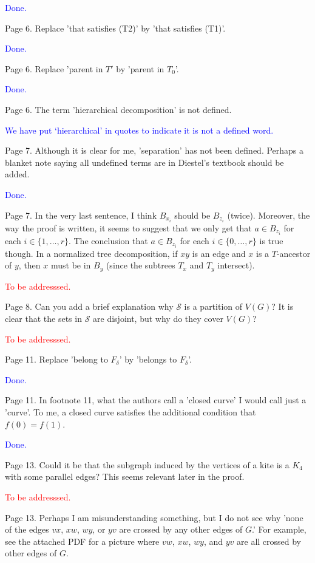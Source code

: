 \documentclass[12pt]{article}
\newcommand{\done}{\textcolor{blue}{Done.}}
\newcommand{\tba}{\textcolor{red}{To be addresssed.}}
\begin{document}
\done

Page 6. Replace 'that satisfies (T2)' by 'that satisfies (T1)'.

\done

Page 6. Replace 'parent in $T'$ by 'parent in $T_0$'.

\done

Page 6. The term 'hierarchical decomposition' is not defined.

\textcolor{blue}{We have put `hierarchical' in quotes to indicate it is not a defined word.}

Page 7. Although it is clear for me, 'separation' has not been
defined.  Perhaps a blanket note saying all undefined terms are in
Diestel's textbook should be added.

\done

Page 7.  In the very last sentence, I think $B_{x_i}$ should be $B_{z_i}$
(twice).  Moreover, the way the proof is written, it seems to suggest
that we only get that $a \in B_{z_i}$ for each $i \in \{1, \dots, r\}$.
The conclusion that $a \in B_{z_i}$ for each $i \in \{0, \dots, r\}$ is
true though.  In a normalized tree decomposition, if $xy$ is an edge and
$x$ is a $T$-ancestor of $y$, then $x$ must be in $B_y$ (since the subtrees $T_x$
and $T_y$ intersect).

\tba

Page 8.  Can you add a brief explanation why $\mathcal{S}$ is a
partition of $V(G)$?  It is clear that the sets in $\mathcal{S}$ are
disjoint, but why do they cover $V(G)$?

\tba

Page 11. Replace 'belong to $F_\delta$' by 'belongs to $F_\delta$'.

\done

Page 11. In footnote 11, what the authors call a 'closed curve' I
would call just a 'curve'.  To me, a closed curve satisfies the
additional condition that $f(0)=f(1)$.

\done

Page 13. Could it be that the subgraph induced by the vertices of a
kite is a $K_4$ with some parallel edges?  This seems relevant later in
the proof.

\tba

Page 13. Perhaps I am misunderstanding something, but I do not see why
'none of the edges $vx$, $xw$, $wy$, or $yv$ are crossed by any other edges of
$G$.'  For example, see the attached PDF for a picture where $vw$, $xw$, $wy$,
and $yv$ are all crossed by other edges of $G$.
\end{document}
